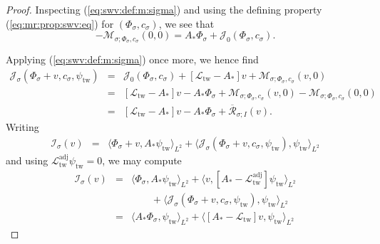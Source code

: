\documentclass[10pt]{articleHJ}
\newcommand{\sref}[1]{(\ref{#1})}                       %
\numberwithin{equation}{section}
\begin{document}
\begin{proof}
Inspecting \sref{eq:swv:def:m:sigma}
and using the defining
property
\sref{eq:mr:prop:swv:eq}
for $(\Phi_{\sigma} , c_{\sigma})$,
we see that
\begin{equation}
-\mathcal{M}_{\sigma;\Phi_{\sigma} ,
   c_{\sigma}}(0, 0)
= A_* \Phi_{\sigma}
  + \mathcal{J}_0
    (\Phi_{\sigma}, c_\sigma ).
\end{equation}

Applying \sref{eq:swv:def:m:sigma}
once more,
we hence find
\begin{equation}
\begin{array}{lcl}
\mathcal{J}_{\sigma}
  ( \Phi_{\sigma} + v, c_{\sigma} , \psi_{\mathrm{tw}})
& = & \mathcal{J}_0
  (\Phi_\sigma, c_{\sigma})
+ [\mathcal{L}_{\mathrm{tw}} - A_*] v
+ \mathcal{M}_{\sigma;\Phi_\sigma , c_\sigma }
     (v, 0)
\\[0.2cm]
& = &
  [\mathcal{L}_{\mathrm{tw}} - A_* ] v
  -A_* \Phi_{\sigma}
  + \mathcal{M}_{\sigma;\Phi_{\sigma} ,
    c_{\sigma} }
     (v, 0)
  - \mathcal{M}_{\sigma;\Phi_{\sigma} ,
     c_{\sigma}}(0, 0)
\\[0.2cm]
& = &
 [\mathcal{L}_{\mathrm{tw}} - A_* ] v
  -A_* \Phi_{\sigma}
  + \overline{\mathcal{R}}_{\sigma;I}(v).
\end{array}
\end{equation}
Writing
\begin{equation}
\begin{array}{lcl}
\mathcal{I}_{\sigma}(v)
& = &
\langle \Phi_{\sigma} + v, A_* \psi_{\mathrm{tw}} \rangle_{L^2}
+ \langle \mathcal{J}_{\sigma}
  (\Phi_{\sigma} + v, c_{\sigma} , \psi_{\mathrm{tw}}),
 \psi_{\mathrm{tw}} \rangle_{L^2}
\end{array}
\end{equation}
and using $\mathcal{L}_{\mathrm{tw}}^{\mathrm{adj}} \psi_{\mathrm{tw}} = 0$,
we may compute
\begin{equation}
\begin{array}{lcl}
\mathcal{I}_{\sigma}(v)
&  = &
\langle \Phi_{\sigma} , A_* \psi_{\mathrm{tw}} \rangle_{L^2}
+
\langle v,
  [A_* - \mathcal{L}_{\mathrm{tw}}^{\mathrm{adj}} ] \psi_{\mathrm{tw}} \rangle_{L^2}
\\[0.2cm]
& & \qquad
+ \langle \mathcal{J}_{\sigma}
  (\Phi_{\sigma} + v, c_{\sigma} , \psi_{\mathrm{tw}}),
 \psi_{\mathrm{tw}} \rangle_{L^2}
\\[0.2cm]
& = &
\langle A_* \Phi_{\sigma}, \psi_{\mathrm{tw}} \rangle_{L^2}
+ \langle [A_* - \mathcal{L}_{\mathrm{tw}} ] v , \psi_{\mathrm{tw}}
  \rangle_{L^2}

\end{array}
\end{equation}
\end{proof}
\end{document}
